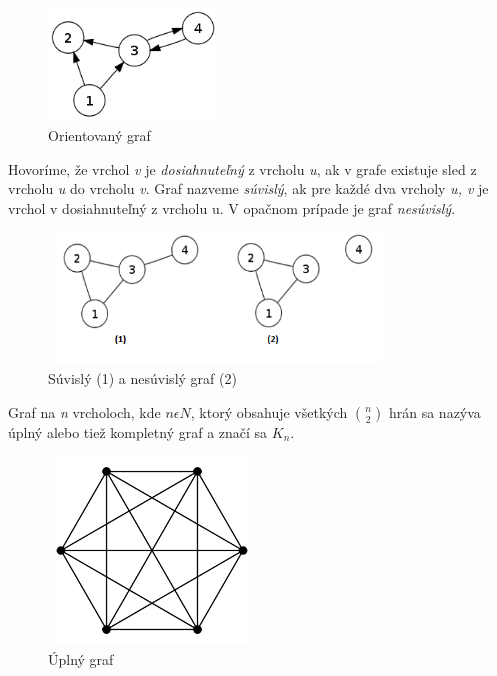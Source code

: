 \documentclass[slovak,master,public,dept460,male,cpdeclaration,oneside]{diploma}
\begin{document}
\begin{figure}[H]
\centering
\includegraphics[width=4.5cm,height=3cm]{figures/orientovany}
\caption{Orientovaný graf}
\end{figure}

\begin{definition}
Hovoríme, že vrchol \textit{v} je \textit{dosiahnuteľný} z vrcholu \textit{u}, ak v grafe existuje sled z vrcholu \textit{u} do vrcholu \textit{v}. Graf nazveme \textit{súvislý}, ak pre každé dva vrcholy \textit{u, v} je vrchol v dosiahnuteľný z vrcholu u. V opačnom prípade je graf \textit{nesúvislý}. \cite{kovavr2012uvod}
\end{definition}



\begin{figure}[H]
\centering
\includegraphics[width=9cm,height=3.5cm]{figures/suvisly_vs_nesuvisly}
\caption{Súvislý (1) a nesúvislý graf (2)}
\end{figure}


\begin{definition}
Graf na \textit{n} vrcholoch, kde ${n \epsilon N}$, ktorý obsahuje všetkých ${\binom{n}{2}}$ hrán sa nazýva úplný alebo tiež kompletný graf a značí sa ${K_{n}}$. \cite{kovavr2012uvod}
\end{definition}


\begin{figure}[H]
\centering
\includegraphics[width=5.5cm,height=5cm]{figures/uplnygraf}
\caption{Úplný graf}
\end{figure}
\end{document}
